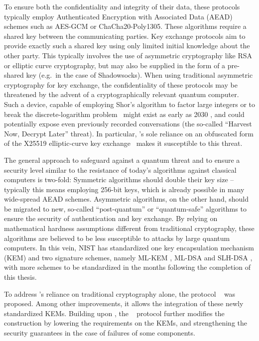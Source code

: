 To ensure both the confidentiality and integrity of their data, these protocols typically employ Authenticated Encryption with Associated Data (AEAD) schemes such as AES-GCM or ChaCha20-Poly1305. These algorithms require a shared key between the communicating parties. Key exchange protocols aim to provide exactly such a shared key using only limited initial knowledge about the other party. This typically involves the use of asymmetric cryptography like RSA or elliptic curve cryptography, but may also be supplied in the form of a pre-shared key (e.g.~in the case of Shadowsocks).
When using traditional asymmetric cryptography for key exchange, the confidentiality of these protocols may be threatened by the advent of a cryptographically relevant quantum computer.
Such a device, capable of employing Shor's algorithm \cite{Shor_1997} to factor large integers or to break the discrete-logarithm problem~\cite{crqc-nccoe} might exist as early as 2030 \cite{quantum-threat-nist,quantum-threat-enisa,quantum-threat-bsi,quantum-threat-joint,quantum-threat-anssi}, and could potentially expose even previously recorded conversations (the so-called ``Harvest Now, Decrypt Later'' threat). In particular, \obfsfour{}'s sole reliance on an obfuscated form of the X25519 elliptic-curve key exchange~\cite{x25519} makes it susceptible to this threat.

The general approach to safeguard against a quantum threat and to ensure a security level similar to the resistance of today's algorithms against classical computers is two-fold:
Symmetric algorithms should double their key size -- typically this means employing 256-bit keys, which is already possible in many wide-spread AEAD schemes. Asymmetric algorithms, on the other hand, should be migrated to new, so-called ``post-quantum'' or ``quantum-safe'' algorithms to ensure the security of authentication and key exchange. By relying on mathematical hardness assumptions different from traditional cryptography, these algorithms are believed to be less susceptible to attacks by large quantum computers. In this vein, NIST has standardized \cite{nist-standardization} one key encapsulation mechanism (KEM) and two signature schemes, namely ML-KEM \cite{fips203}, ML-DSA \cite{fips204} and SLH-DSA \cite{fips205}, with more schemes to be standardized in the months following the completion of this thesis.

To address \obfsfour{}'s reliance on traditional cryptography alone, the protocol \pqobfs{}~\cite{CCS:GunSteVei24} was proposed. Among other improvements, it allows the integration of these newly standardized KEMs.
Building upon \pqobfs{}, the \drivel{}~\cite{EPRINT:GRSV25} protocol further modifies the construction by lowering the requirements on the KEMs, and strengthening the security guarantees in the case of failures of some components.


